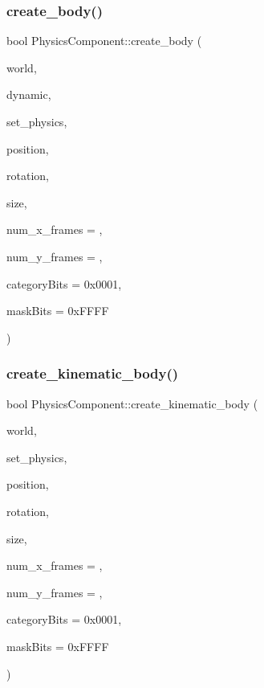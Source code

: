 \subsubsection{\texorpdfstring{create\+\_\+body()}{create\_body()}}
{\footnotesize\ttfamily bool Physics\+Component\+::create\+\_\+body (\begin{DoxyParamCaption}\item[{b2\+World $\ast$}]{world,  }\item[{bool}]{dynamic,  }\item[{bool}]{set\+\_\+physics,  }\item[{glm\+::vec2}]{position,  }\item[{float}]{rotation,  }\item[{glm\+::vec2}]{size,  }\item[{unsigned int}]{num\+\_\+x\+\_\+frames = {},  }\item[{unsigned int}]{num\+\_\+y\+\_\+frames = {},  }\item[{uint16}]{category\+Bits = {\ttfamily 0x0001},  }\item[{uint16}]{mask\+Bits = {\ttfamily 0xFFFF} }\end{DoxyParamCaption})}

\mbox{\label{classPhysicsComponent_a3103543ce56426e419481b02e2107009}} 
\subsubsection{\texorpdfstring{create\+\_\+kinematic\+\_\+body()}{create\_kinematic\_body()}}
{\footnotesize\ttfamily bool Physics\+Component\+::create\+\_\+kinematic\+\_\+body (\begin{DoxyParamCaption}\item[{b2\+World $\ast$}]{world,  }\item[{bool}]{set\+\_\+physics,  }\item[{glm\+::vec2}]{position,  }\item[{float}]{rotation,  }\item[{glm\+::vec2}]{size,  }\item[{unsigned int}]{num\+\_\+x\+\_\+frames = {},  }\item[{unsigned int}]{num\+\_\+y\+\_\+frames = {},  }\item[{uint16}]{category\+Bits = {\ttfamily 0x0001},  }\item[{uint16}]{mask\+Bits = {\ttfamily 0xFFFF} }\end{DoxyParamCaption})}

